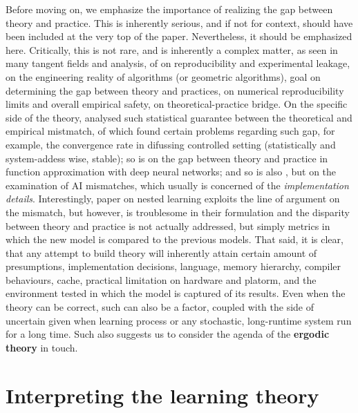 \documentclass[
  journal=largetwo,
  year=2025,
  volume=37,
]{cup-journal}
\begin{document}
Before moving on, we emphasize the importance of realizing the gap between theory and practice. This is inherently serious, and if not for context, should have been included at the very top of the paper. Nevertheless, it should be emphasized here. Critically, this is not rare, and is inherently a complex matter, as seen in many tangent fields and analysis, of \cite{semmelrock2023reproducibilitymachinelearningdrivenresearch,KAPOOR2023100804} on reproducibility and experimental leakage, \cite{Kliemann2016,Tamassia1997ACS} on the engineering reality of algorithms (or geometric algorithms), \cite{bgpt2024} goal on determining the gap between theory and practices, \cite{Revol_2014,COLLANGE201583,Diethelm2012} on numerical reproducibility limits and overall empirical safety, \cite{Kaskenpalo_2012} on theoretical-practice bridge. On the specific side of the theory, \cite{holk2025statisticalguaranteesdenoisingreflected} analysed such statistical guarantee between the theoretical and empirical mistmatch, of which found certain problems regarding such gap, for example, the convergence rate in difussing controlled setting (statistically and system-addess wise, stable); so is \cite{adcock2021gaptheorypracticefunction} on the gap between theory and practice in function approximation with deep neural networks; and so is also \cite{saxena2025aimismatchesidentifyingpotential}, but on the examination of AI mismatches, which usually is concerned of the \textit{implementation details}. Interestingly, \cite{behrouz2025nested} paper on nested learning exploits the line of argument on the mismatch, but however, is troublesome in their formulation and the disparity between theory and practice is not actually addressed, but simply metrics in which the new model is compared to the previous models. That said, it is clear, that any attempt to build theory will inherently attain certain amount of presumptions, implementation decisions, language, memory hierarchy, compiler behaviours, cache, practical limitation on hardware and platorm, and the environment tested in which the model is captured of its results. Even when the theory can be correct, such can also be a factor, coupled with the side of uncertain given when learning process or any stochastic, long-runtime system run for a long time. Such also suggests us to consider the agenda of the \textbf{ergodic theory} in touch. 

\section{Interpreting the learning theory}
\end{document}
